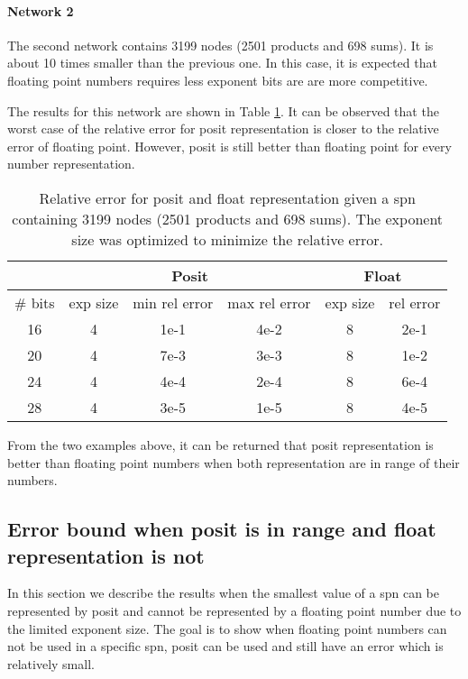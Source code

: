 \paragraph{Network 2}

The second network contains 3199 nodes (2501 products and 698 sums). It is about 10 times smaller than the previous one. In this case, it is expected that floating point numbers requires less exponent bits are are more competitive.

The results for this network are shown in Table \ref{tab:net2_res}. It can be observed that the worst case of the relative error for posit representation is closer to the relative error of floating point. However, posit is still better than floating point for every number representation.

\begin{table}[!ht]
	\centering
	\caption{Relative error for posit and float representation given a \gls{spn} containing 3199 nodes (2501 products and 698 sums). The exponent size was optimized to minimize the relative error.}
	\label{tab:net2_res}
	\begin{tabular}{|c||c|c|c||c|c|}
	\hline
		& \multicolumn{3}{c||}{Posit} &  \multicolumn{2}{c|}{Float} \\
	\hline
		\# bits & exp size & min rel error & max rel error & exp size & rel error \\
	\hline
		16 & 4 & 1e-1 & 4e-2 & 8 & 2e-1 \\
		20 & 4 & 7e-3 & 3e-3 & 8 & 1e-2 \\
		24 & 4 & 4e-4 & 2e-4 & 8 & 6e-4 \\
		28 & 4 & 3e-5 & 1e-5 & 8 & 4e-5 \\
	\hline
	\end{tabular}
\end{table}


From the two examples above, it can be returned that posit representation is better than floating point numbers when both representation are in range of their numbers.



\subsection{Error bound when posit is in range and float representation is not}
In this section we describe the results when the smallest value of a \gls{spn} can be represented by posit and cannot be represented by a floating point number due to the limited exponent size. The goal is to show when floating point numbers can not be used in a specific \gls{spn}, posit can be used and still have an error which is relatively small.

